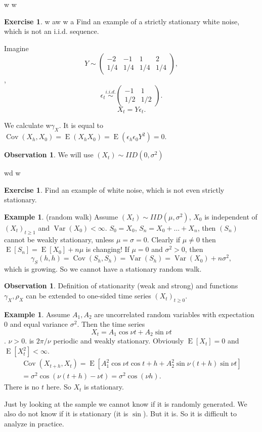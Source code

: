 \documentclass[12pt,a4paper, notitlepage]{book}
\theoremstyle{definition} %
\newtheorem{example}[definition]{Example}
\newtheorem{exercise}[definition]{Exercise}
\newtheorem{observation}[definition]{Observation}
\theoremstyle{plain} %
\DeclareMathOperator{\Var}{Var}
\DeclareMathOperator{\Cov}{Cov}
\DeclareMathOperator{\E}{E}
\begin{document}
w w
\begin{exercise}w              aw              w a
Find an example of a strictly stationary white noise, which is not an i.i.d. sequence.
\end{exercise}
\begin{hint} Imagine 
\[ Y \sim \left( \begin{array}{cccc} -2 & -1 & 1 & 2 \\  1/4 &1/4 & 1/4 &1/4 \end{array} \right) , \]
, \[ \epsilon_t  \overset{i.i.d.}{\sim}  \left( \begin{array}{cc} -1& 1 \\ 1/2 &1/2 \end{array} \right) . \]
 \[ X_t = Y \epsilon_t . \]


 We calculate 
w$ \gamma_X$. It is equal to $ \Cov(X_h, X_0) = \E(X_h X_0) = \E(\epsilon_h \epsilon_0 Y^2) = 0$.
\end{hint}

\begin{observation} We will use $(X_t) \sim IID(0, \sigma^2)$ \end{observation}
wd            w    
\begin{exercise}
Find an example of white noise, which is not even strictly stationary.
\end{exercise}

\begin{example} (random walk)
Assume $(X_t) \sim IID(\mu, \sigma^2)$, $X_0$ is independent of $(X_t)_{t \geq 1}$ and $ \Var(X_0) < \infty$.
$ S_0 = X_0$, $S_n = X_0 + \dots + X_n$, then $(S_n)$ cannot be weakly stationary, unless $ \mu = \sigma = 0 $.
Clearly if $\mu \neq 0$ then $ \E[S_n] = \E[X_0] + n\mu$ is changing!
If $\mu = 0$ and $\sigma^2 > 0$, then 
\[ \gamma_S(h,h) = \Cov(S_h, S_h) = \Var(S_h) = \Var(X_0) + n \sigma^2, \]
 which is growing. So we cannot have a stationary random walk.
\end{example}

\begin{observation}
Definition of stationarity (weak and strong) and functions $\gamma_X, \rho_X$ can be extended to one-sided time series $(X_t)_ {t\geq 0}$. 
\end{observation}


\begin{example}
Assume $A_1, A_2$ are uncorrelated random variables with expectation $0$ and equal variance $\sigma^2$. Then the time series 
\[ X_t = A_1 \cos{\nu t} +A_2 \sin{\nu t} \] . $\nu > 0$.
is $2 \pi / \nu$ periodic and weakly stationary.
Obviously $ \E[X_t] = 0$ and $\E[X_t^2] < \infty$.
\begin{align*} \Cov(X_{t+h}, X_t)  = \E[ A_1^2 \cos{\nu t}\cos{t + h} + A_2^2 \sin{\nu(t + h)}\sin{\nu t} ] \\
= \sigma^2 \cos(\nu (t + h) - \nu t) = \sigma^2 \cos(\nu h). \end{align*}
There is no $t$ here. So $X_t$ is stationary. 

Just by looking at the sample we cannot know if it is randomly generated. We also do not know if it is stationary (it is $\sin$).
But it is. So it is difficult to analyze in practice.
\end{example}
\end{document}
